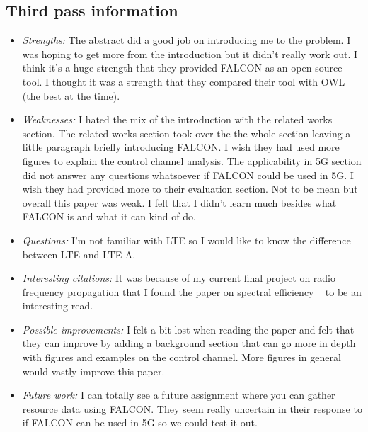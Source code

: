 \documentclass[letterpaper,twocolumn,10pt]{article}
\begin{document}
\subsection{Third pass information}
\label{sec:third}
\begin{itemize}

\item {\it Strengths:}
The abstract did a good job on introducing me to the problem. I was hoping to get more from the introduction but 
it didn't really work out. I think it's a huge strength that they provided FALCON as an open source tool. I thought
it was a strength that they compared their tool with OWL (the best at the time).

\item {\it Weaknesses:} 
I hated the mix of the introduction with the related works section. The related works section took over the the whole
section leaving a little paragraph briefly introducing FALCON. I wish they had used more figures to explain the 
control channel analysis. The applicability in 5G section did not answer any questions whatsoever if FALCON 
could be used in 5G. I wish they had provided more to their evaluation section. Not to be mean but overall this 
paper was weak. I felt that I didn't learn much besides what FALCON is and what it can kind of do. 

\item {\it Questions:}
I'm not familiar with LTE so I would like to know the difference between LTE and LTE-A.

\item {\it Interesting citations:} 
It was because of my current final project on radio frequency propagation that I found the paper on 
spectral efficiency ~\cite{spectralefficiency} to be an interesting read. 

\item {\it Possible improvements:} 
 I felt a bit lost when reading the paper and felt that they can improve by adding a background section
 that can go more in depth with figures and examples on the control channel. More figures in general 
 would vastly improve this paper. 

\item {\it Future work:}
I can totally see a future assignment where you can gather resource data using FALCON. They seem really
uncertain in their response to if FALCON can be used in 5G so we could test it out. 


\end{itemize}

{
  \small 
  
  
}
\end{document}
